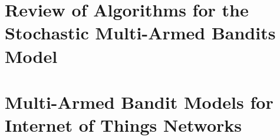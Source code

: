 \setcounter{mtc}{1}
\adjustmtc



\part{Review of Algorithms for the Stochastic Multi-Armed Bandits Model}







\part{Multi-Armed Bandit Models for Internet of Things Networks}








